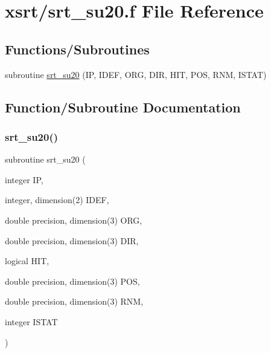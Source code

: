 \hypertarget{srt__su20_8f}{}\section{xsrt/srt\+\_\+su20.f File Reference}
\label{srt__su20_8f}
\subsection*{Functions/\+Subroutines}
\begin{DoxyCompactItemize}
\item 
subroutine \hyperlink{srt__su20_8f_a494eb8fc0702a1c8a6117da5b93902d4}{srt\+\_\+su20} (IP, I\+D\+EF, O\+RG, D\+IR, H\+IT, P\+OS, R\+NM, I\+S\+T\+AT)
\end{DoxyCompactItemize}


\subsection{Function/\+Subroutine Documentation}
\mbox{\label{srt__su20_8f_a494eb8fc0702a1c8a6117da5b93902d4}} 
\subsubsection{\texorpdfstring{srt\+\_\+su20()}{srt\_su20()}}
{\footnotesize\ttfamily subroutine srt\+\_\+su20 (\begin{DoxyParamCaption}\item[{integer}]{IP,  }\item[{integer, dimension(2)}]{I\+D\+EF,  }\item[{double precision, dimension(3)}]{O\+RG,  }\item[{double precision, dimension(3)}]{D\+IR,  }\item[{logical}]{H\+IT,  }\item[{double precision, dimension(3)}]{P\+OS,  }\item[{double precision, dimension(3)}]{R\+NM,  }\item[{integer}]{I\+S\+T\+AT }\end{DoxyParamCaption})}

